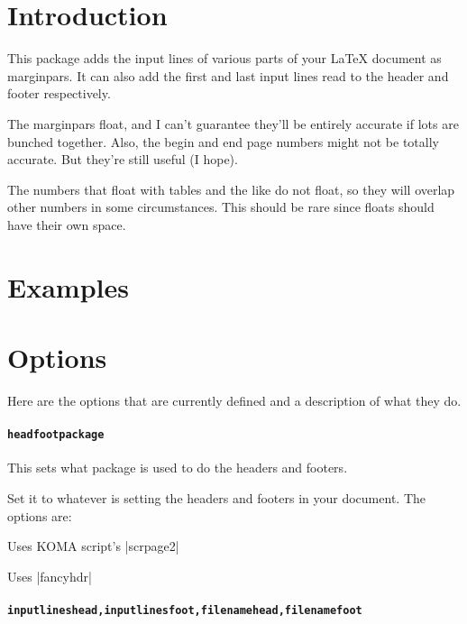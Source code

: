 \documentclass{scrartcl}
\begin{document}

\section{Introduction}


This package adds the input lines of various parts of your LaTeX
document as marginpars.
It can also add the first and last input lines read to the header and
footer respectively.

The marginpars float, and I can't guarantee they'll be entirely
accurate if lots are bunched together.
Also, the begin and end page numbers might not be totally accurate.
But they're still useful (I hope).

The numbers that float with tables and the like do not float, so they
will overlap other numbers in some circumstances.
This should be rare since floats should have their own space.

\section{Examples}


\section{Options}
Here are the options that are currently defined and a description of
what they do.

\paragraph{\lstinline+headfootpackage+}
This sets what package is used to do the headers and footers.

Set it to whatever is setting the headers and footers in your
document.
The options are:
\begin{description}[labelindent=1cm]
\item[scrpage] Uses KOMA script's |scrpage2|
\item[fancyhdr] Uses |fancyhdr|
\end{description}

\paragraph{\lstinline+inputlineshead,inputlinesfoot,filenamehead,filenamefoot+}
\end{document}
